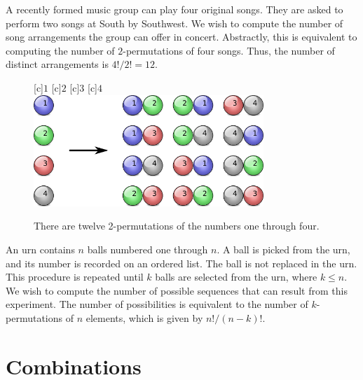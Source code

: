 \begin{example}
A recently formed music group can play four original songs.
They are asked to perform two songs at South by Southwest.
We wish to compute the number of song arrangements the group can offer in concert.
Abstractly, this is equivalent to computing the number of $2$-permutations of four songs.
Thus, the number of distinct arrangements is ${4!}/{2!} = 12$.
\end{example}

\begin{figure}[htb!]
\begin{center}
\begin{psfrags}
[c]{$1$}
[c]{$2$}
[c]{$3$}
[c]{$4$}
\includegraphics[height=4.215cm]{Figures/4Chapter/kpermutation}
\end{psfrags}
\caption{There are twelve 2-permutations of the numbers one through four.}
\label{figure:Kpermutation}
\end{center}
\end{figure}

\begin{example}
An urn contains $n$ balls numbered one through $n$.
A ball is picked from the urn, and its number is recorded on an ordered list.
The ball is not replaced in the urn.
This procedure is repeated until $k$ balls are selected from the urn, where $k \leq n$.
We wish to compute the number of possible sequences that can result from this experiment.
The number of possibilities is equivalent to the number of $k$-permutations of $n$ elements, which is given by $n! / (n-k)!$.
\end{example}


\section{Combinations}

